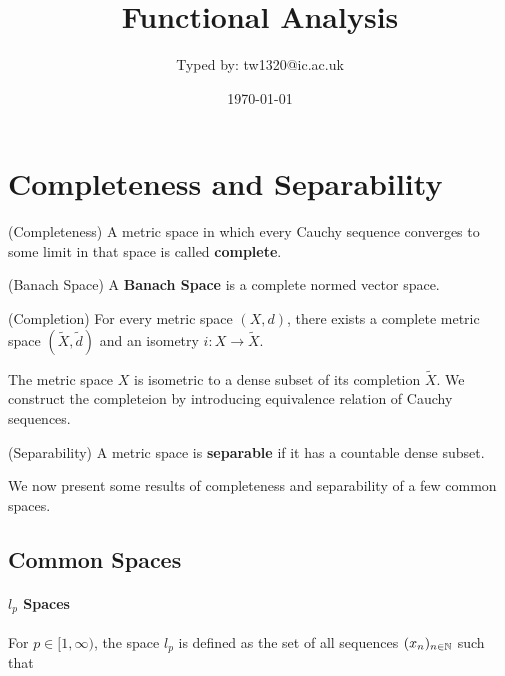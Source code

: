 \documentclass{article}
\title{Functional Analysis}
\author{Typed by: tw1320@ic.ac.uk}
\date{\today}
\begin{document}
\maketitle



\section{Completeness and Separability}  

\begin{defn}
    (Completeness)
    A metric space in which every Cauchy sequence converges to some limit in that space is called 
    \textbf{complete}.  
\end{defn}  

\begin{defn}
    (Banach Space) 
    A \textbf{Banach Space} is a complete normed vector space.
\end{defn}

\begin{thm}
    (Completion)  
    For every metric space $(X, d)$, there exists a complete metric space $(\tilde{X}, \tilde{d})$ 
    and an isometry $i: X \to \tilde{X}$.   
\end{thm}  

\begin{remark}
    The metric space $X$ is isometric to a dense subset of its completion $\tilde{X}$.  
    We construct the completeion by introducing equivalence relation of Cauchy sequences.
\end{remark}

\begin{defn}
    (Separability) 
    A metric space is \textbf{separable} if it has a countable dense subset.  
\end{defn}  

We now present some results of completeness and separability of a few common spaces.    

\subsection{Common Spaces}  

\paragraph*{$l_p$ Spaces}    
For $p \in [1,\infty)$, the space $l_p$ is defined as the set of all sequences $(x_n)_{n\in \mathbb{N}}$ such that  
\end{document}
